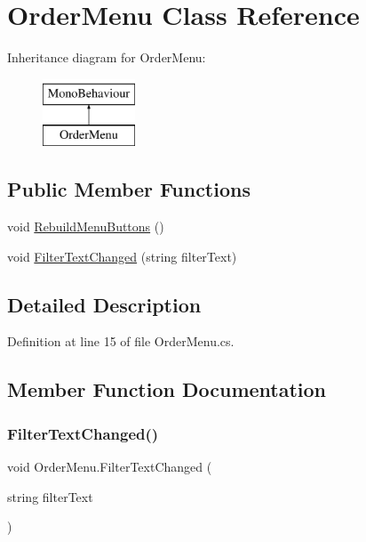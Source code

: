 \hypertarget{class_order_menu}{}\section{Order\+Menu Class Reference}
\label{class_order_menu}
Inheritance diagram for Order\+Menu\+:\begin{figure}[H]
\begin{center}
\leavevmode
\includegraphics[height=2.000000cm]{class_order_menu}
\end{center}
\end{figure}
\subsection*{Public Member Functions}
\begin{DoxyCompactItemize}
\item 
void \hyperlink{class_order_menu_a0d833194dcbdb65111b072fdc044a329}{Rebuild\+Menu\+Buttons} ()
\item 
void \hyperlink{class_order_menu_aecd302db9b05a2c423e541b61bdb1014}{Filter\+Text\+Changed} (string filter\+Text)
\end{DoxyCompactItemize}


\subsection{Detailed Description}


Definition at line 15 of file Order\+Menu.\+cs.



\subsection{Member Function Documentation}
\mbox{\label{class_order_menu_aecd302db9b05a2c423e541b61bdb1014}} 
\subsubsection{\texorpdfstring{Filter\+Text\+Changed()}{FilterTextChanged()}}
{\footnotesize\ttfamily void Order\+Menu.\+Filter\+Text\+Changed (\begin{DoxyParamCaption}\item[{string}]{filter\+Text }\end{DoxyParamCaption})}



